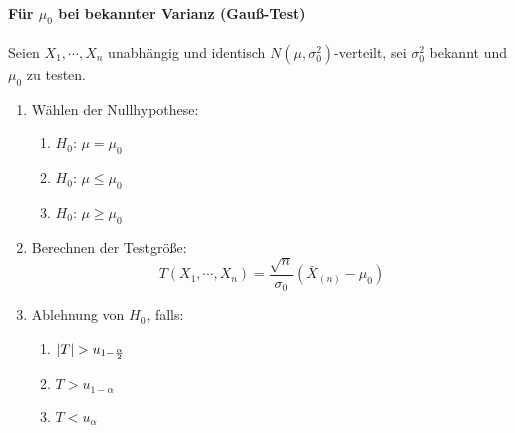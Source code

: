 		\paragraph{Für \(\mu_0\) bei bekannter Varianz (Gauß-Test)}
			Seien \( X_1, \cdots, X_n \) unabhängig und identisch \( N(\mu, \sigma_0^2) \)-verteilt, sei \(\sigma_0^2\) bekannt und \(\mu_0\) zu testen.
			\begin{enumerate}
				\item Wählen der Nullhypothese:
					\begin{enumerate}[label = \Alph*)]
						\item \( H_0 \): \quad \( \mu = \mu_0 \)
						\item \( H_0 \): \quad \( \mu \leq \mu_0 \)
						\item \( H_0 \): \quad \( \mu \geq \mu_0 \)
					\end{enumerate}
				\item Berechnen der Testgröße:
					\begin{equation*}
						T(X_1, \cdots, X_n) = \frac{\sqrt{n}}{\sigma_0} (\bar{X}_{(n)} - \mu_0)
					\end{equation*}
				\item Ablehnung von \(H_0\), falls:
					\begin{enumerate}[label = \Alph*)]
						\item \( \abs{T} > u_{1 - \frac{\alpha}{2}} \)
						\item \( T > u_{1 - \alpha} \)
						\item \( T < u_\alpha \)
					\end{enumerate}
			\end{enumerate}


